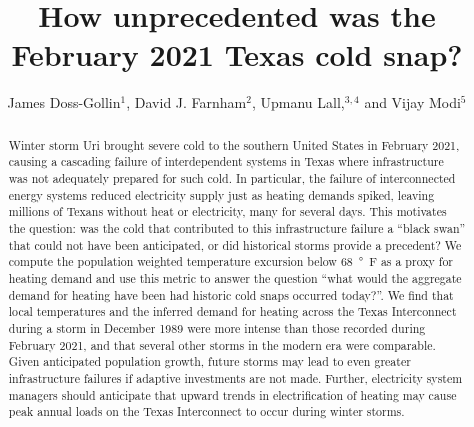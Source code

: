 \documentclass[12pt]{iopart}
\begin{document}
\title{How unprecedented was the February 2021 Texas cold snap?}

\author{James Doss-Gollin$^1$, David J. Farnham$^2$, Upmanu Lall,$^{3,4}$ and Vijay Modi$^5$}
\address{$^1$ Department of Civil and Environmental Engineering, Rice University, Houston, TX, USA (ORCID 0000-0002-3428-2224)}
\address{$^2$ Department of Global Ecology, Carnegie Institution for Science, Stanford, CA, USA (ORCID 0000-0002-6690-4251)}
\address{$^3$ Columbia Water Center, Columbia University, New York, NY, USA (ORCID 0000-0003-0529-8128)}
\address{$^4$ Department of Earth and Environmental Engineering, Columbia University, New York, NY, USA}
\address{$^4$ Department of Mechanical Engineering, Columbia University, New York, NY, USA (ORCID 0000-0003-2513-0437)}
\vspace{10pt}

\begin{abstract}
  Winter storm Uri brought severe cold to the southern United States in February 2021, causing a cascading failure of interdependent systems in Texas where infrastructure was not adequately prepared for such cold.
  In particular, the failure of interconnected energy systems reduced electricity supply just as heating demands spiked, leaving millions of Texans without heat or electricity, many for several days.
  This motivates the question: was the cold that contributed to this infrastructure failure a ``black swan'' that could not have been anticipated, or did historical storms provide a precedent?
  We compute the population weighted temperature excursion below \SI{68}{\degree F} as a proxy for heating demand and use this metric to answer the question ``what would the aggregate demand for heating have been had historic cold snaps occurred today?''.
  We find that local temperatures and the inferred demand for heating across the Texas Interconnect during a storm in December 1989 were more intense than those recorded during February 2021, and that several other storms in the modern era were comparable.
  Given anticipated population growth, future storms may lead to even greater infrastructure failures if adaptive investments are not made.
  Further, electricity system managers should anticipate that upward trends in electrification of heating may cause peak annual loads on the Texas Interconnect to occur during winter storms.

\end{abstract}
\end{document}
